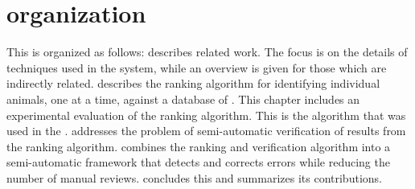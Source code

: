 
\section{\Thesis{} organization} %
    This \thesis{} is organized as follows:
     describes related work.
    The focus is on the details of techniques used in the system, while an overview is given for those which are
      indirectly related.
     describes the ranking algorithm for identifying individual animals, one \annot{} at a
      time, against a database of \exemplars{}.
    This chapter includes an experimental evaluation of the ranking algorithm.
    This is the algorithm that was used in the \GZC{}.
     addresses the problem of semi-automatic verification of results from the ranking
      algorithm.
     combines the ranking and verification algorithm into a semi-automatic framework that
      detects and corrects errors while reducing the number of manual reviews.
     concludes this \thesis{} and summarizes its contributions.
